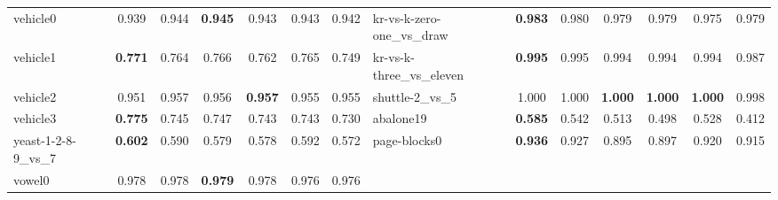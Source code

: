 \begin{table}[t]
\begin{tabular}{@{}lcccccc@{\hspace{12pt}}lcccccc@{}}
vehicle0 & 0.939 & 0.944 & \textbf{0.945} & 0.943 & 0.943 & 0.942 & kr-vs-k-zero-one\_vs\_draw & \textbf{0.983} & 0.980 & 0.979 & 0.979 & 0.975 & 0.979 \\
vehicle1 & \textbf{0.771} & 0.764 & 0.766 & 0.762 & 0.765 & 0.749 & kr-vs-k-three\_vs\_eleven & \textbf{0.995} & 0.995 & 0.994 & 0.994 & 0.994 & 0.987 \\
vehicle2 & 0.951 & 0.957 & 0.956 & \textbf{0.957} & 0.955 & 0.955 & shuttle-2\_vs\_5 & 1.000 & 1.000 & \textbf{1.000} & \textbf{1.000} & \textbf{1.000} & 0.998 \\
vehicle3 & \textbf{0.775} & 0.745 & 0.747 & 0.743 & 0.743 & 0.730 & abalone19 & \textbf{0.585} & 0.542 & 0.513 & 0.498 & 0.528 & 0.412 \\
yeast-1-2-8-9\_vs\_7 & \textbf{0.602} & 0.590 & 0.579 & 0.578 & 0.592 & 0.572 & page-blocks0 & \textbf{0.936} & 0.927 & 0.895 & 0.897 & 0.920 & 0.915 \\
vowel0 & 0.978 & 0.978 & \textbf{0.979} & 0.978 & 0.976 & 0.976 &  &  &  &  &  &  &  \\
\bottomrule
\end{tabular}
\end{table}
